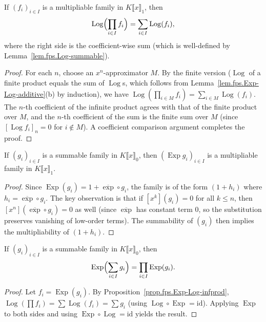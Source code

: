 \begin{proposition}
\label{prop.fps.Exp-Log-infprod}
\leanhelper
\leanok
If $(f_i)_{i \in I}$ is a multipliable family in
$K\llbracket x \rrbracket_1$, then
\[
\operatorname{Log}\Bigl(\prod_{i \in I} f_i\Bigr)
= \sum_{i \in I} \operatorname{Log}(f_i),
\]
where the right side is the coefficient-wise sum
(which is well-defined by Lemma~\ref{lem.fps.Log-summable}).
\end{proposition}

\begin{proof}
\leanok
For each $n$, choose an $x^n$-approximator $M$.
By the finite version ($\operatorname{Log}$ of a finite product
equals the sum of $\operatorname{Log}$s, which follows from
Lemma~\ref{lem.fps.Exp-Log-additive}(b) by induction), we have
$\operatorname{Log}(\prod_{i \in M} f_i) = \sum_{i \in M} \operatorname{Log}(f_i)$.
The $n$-th coefficient of the infinite product agrees with that of
the finite product over $M$, and the $n$-th coefficient of the sum
is the finite sum over $M$ (since $[\operatorname{Log} f_i]_n = 0$
for $i \notin M$). A coefficient comparison argument completes the proof.
\end{proof}

\begin{lemma}
\label{lem.fps.Exp-multipliable}
\leanhelper
\leanok
If $(g_i)_{i \in I}$ is a summable family in
$K\llbracket x \rrbracket_0$, then $(\operatorname{Exp} g_i)_{i \in I}$
is a multipliable family in $K\llbracket x \rrbracket_1$.
\end{lemma}

\begin{proof}
\leanok
Since $\operatorname{Exp}(g_i) = 1 + \overline{\exp} \circ g_i$,
the family is of the form $(1 + h_i)$ where $h_i = \overline{\exp} \circ g_i$.
The key observation is that if $[x^k](g_i) = 0$ for all $k \le n$,
then $[x^n](\overline{\exp} \circ g_i) = 0$ as well
(since $\overline{\exp}$ has constant term $0$, so the substitution
preserves vanishing of low-order terms).
The summability of $(g_i)$ then implies the multipliability of
$(1 + h_i)$.
\end{proof}

\begin{proposition}
\label{prop.fps.Exp-Log-infsum}
\leanhelper
\leanok
If $(g_i)_{i \in I}$ is a summable family in
$K\llbracket x \rrbracket_0$, then
\[
\operatorname{Exp}\Bigl(\sum_{i \in I} g_i\Bigr)
= \prod_{i \in I} \operatorname{Exp}(g_i).
\]
\end{proposition}

\begin{proof}
\leanok
Let $f_i = \operatorname{Exp}(g_i)$.
By Proposition~\ref{prop.fps.Exp-Log-infprod},
$\operatorname{Log}(\prod f_i) = \sum \operatorname{Log}(f_i) = \sum g_i$
(using $\operatorname{Log} \circ \operatorname{Exp} = \mathrm{id}$).
Applying $\operatorname{Exp}$ to both sides and using
$\operatorname{Exp} \circ \operatorname{Log} = \mathrm{id}$ yields the result.
\end{proof}
